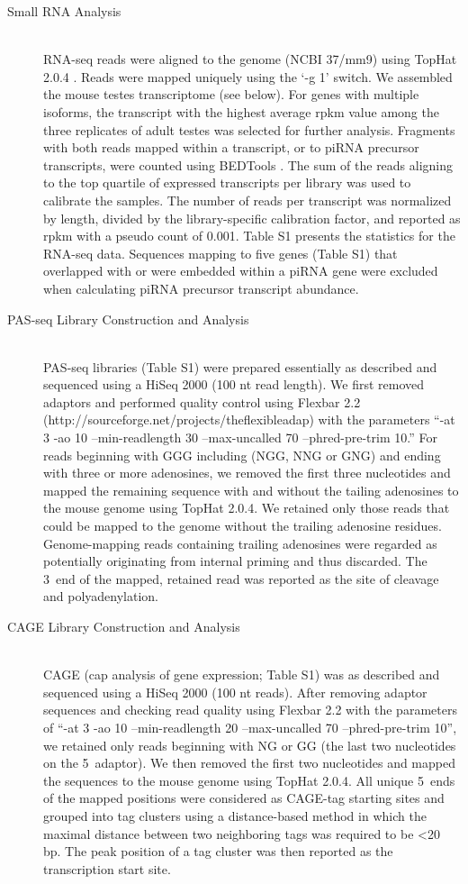 \begin{description}
    \item[Small RNA Analysis] \hfill \\
    RNA-seq reads were aligned to the genome (NCBI 37/mm9) using TopHat 2.0.4 \citep{Trapnell2009}. Reads were mapped uniquely using the ‘-g 1’ switch. We assembled the mouse testes transcriptome (see below). For genes with multiple isoforms, the transcript with the highest average rpkm value among the three replicates of adult testes was selected for further analysis. Fragments with both reads mapped within a transcript, or to piRNA precursor transcripts, were counted using BEDTools \citep{Quinlan2010}. The sum of the reads aligning to the top quartile of expressed transcripts per library was used to calibrate the samples. The number of reads per transcript was normalized by length, divided by the library-specific calibration factor, and reported as rpkm with a pseudo count of 0.001. Table S1 presents the statistics for the RNA-seq data. Sequences mapping to five genes (Table S1) that overlapped with or were embedded within a piRNA gene were excluded when calculating piRNA precursor transcript abundance.

    \item[PAS-seq Library Construction and Analysis] \hfill \\
    PAS-seq libraries (Table S1) were prepared essentially as described \citep{Shepard2011} and sequenced using a HiSeq 2000 (100 nt read length). We first removed adaptors and performed quality control using Flexbar 2.2 (http://sourceforge.net/projects/theflexibleadap) with the parameters “-at 3 -ao 10 --min-readlength 30 --max-uncalled 70 --phred-pre-trim 10.” For reads beginning with GGG including (NGG, NNG or GNG) and ending with three or more adenosines, we removed the first three nucleotides and mapped the remaining sequence with and without the tailing adenosines to the mouse genome using TopHat 2.0.4. We retained only those reads that could be mapped to the genome without the trailing adenosine residues. Genome-mapping reads containing trailing adenosines were regarded as potentially originating from internal priming and thus discarded. The 3\textprime~end of the mapped, retained read was reported as the site of cleavage and polyadenylation.

    \item[CAGE Library Construction and Analysis] \hfill \\
    CAGE (cap analysis of gene expression; Table S1) was as described \citep{Yang2011} and sequenced using a HiSeq 2000 (100 nt reads). After removing adaptor sequences and checking read quality using Flexbar 2.2 with the parameters of “-at 3 -ao 10 --min-readlength 20 --max-uncalled 70 --phred-pre-trim 10”, we retained only reads beginning with NG or GG (the last two nucleotides on the 5\textprime~adaptor). We then removed the first two nucleotides and mapped the sequences to the mouse genome using TopHat 2.0.4. All unique 5\textprime~ends of the mapped positions were considered as CAGE-tag starting sites and grouped into tag clusters using a distance-based method in which the maximal distance between two neighboring tags was required to be <20 bp. The peak position of a tag cluster was then reported as the transcription start site.


\end{description}
